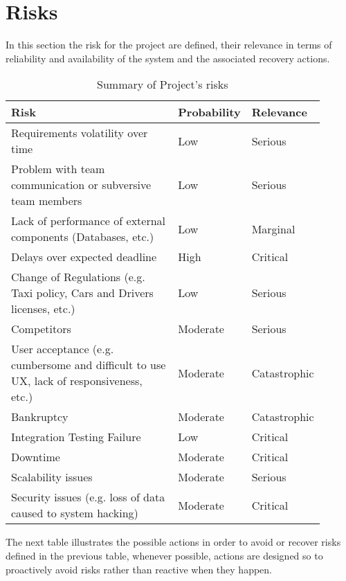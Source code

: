 \newpage
\section{Risks}
In this section the risk for the project are defined, their relevance in terms of reliability and availability of the system and the associated recovery actions.
\begin{table}[H]
	\centering
	\begin{tabular}{p{0.6\linewidth}x{0.15\linewidth}x{0.15\linewidth}}
	\hline
	\textbf{Risk} & \textbf{Probability} & \textbf{Relevance} \\
	\hline
	Requirements volatility over time & Low & Serious \\
	Problem with team communication or subversive team members & Low & Serious \\
	Lack of performance of external components (Databases, etc.) & Low & Marginal \\
	Delays over expected deadline & High & Critical \\ 
	Change of Regulations (e.g. Taxi policy, Cars and Drivers licenses, etc.) & Low & Serious \\
	Competitors & Moderate & Serious \\
	User acceptance (e.g. cumbersome and difficult to use UX, lack of responsiveness, etc.) & Moderate & Catastrophic \\
	Bankruptcy & Moderate & Catastrophic \\
	Integration Testing Failure & Low & Critical \\
	Downtime & Moderate & Critical \\
	Scalability issues & Moderate & Serious \\
	Security issues (e.g. loss of data caused to system hacking) & Moderate & Critical \\
	\hline
	\end{tabular}
	\caption{Summary of Project's risks}
\end{table} 
The next table illustrates the possible actions in order to avoid or recover risks defined in the previous table, whenever possible, actions are designed so to proactively avoid risks rather than reactive when they happen.
